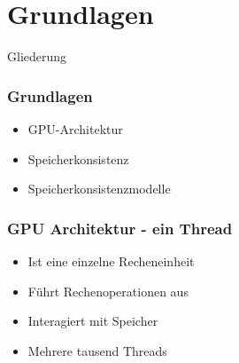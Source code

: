 \documentclass{sikslides}
\begin{document}
\section{Grundlagen}

\begin{frame}{Gliederung}
   
    	\tableofcontents[currentsection, subsectionstyle=show/show/hide]
\end{frame}


\begin{frame}
	\frametitle{Grundlagen}
  \begin{itemize}
  \item GPU-Architektur
\bigskip
  \item Speicherkonsistenz
\bigskip
  \item Speicherkonsistenzmodelle
  \end{itemize}
\end{frame}





\begin{frame}
  \frametitle{GPU Architektur - ein Thread}
  \begin{itemize}
  \item Ist eine einzelne Recheneinheit
\bigskip
  \item Führt Rechenoperationen aus
\bigskip
  \item Interagiert mit Speicher
\bigskip
  \item Mehrere tausend Threads 


  \end{itemize}
\end{frame}


\end{document}
